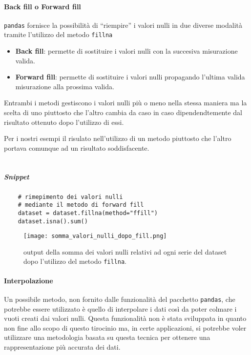 \paragraph{Back fill o Forward fill}
\texttt{pandas} fornisce la possibilità di ``riempire'' i valori nulli in due diverse
modalità tramite l'utilizzo del metodo \texttt{fillna}
\begin{itemize}
    \item \textbf{Back fill}: permette di sostituire i valori nulli con la succesiva
    misurazione valida.
    \item \textbf{Forward fill}:  permette di sostituire i valori nulli propagando
    l'ultima valida misurazione alla prossima valida.
\end{itemize}
Entrambi i metodi gestiscono i valori nulli più o meno nella stessa maniera ma la scelta
di uno piuttosto che l'altro cambia da caso in caso dipendendtemente dal risultato
ottenuto dopo l'utilizzo di essi.


Per i nostri esempi il risulato nell'utilizzo di un metodo piuttosto che l'altro
portava comunque ad un risultato soddisfacente.\\
\\
\subparagraph*{Snippet}
\begin{verbatim}
    # rimepimento dei valori nulli 
    # mediante il metodo di forward fill
    dataset = dataset.fillna(method="ffill")
    dataset.isna().sum()
\end{verbatim}
\begin{figure}[h!]
    \centering
    \texttt{[image: somma\_valori\_nulli\_dopo\_fill.png]}
    \caption{output della somma dei valori nulli relativi ad ogni serie del dataset dopo l'utilizzo del metodo \texttt{fillna}.}
\end{figure}


\paragraph{Interpolazione} 
Un possibile metodo, non fornito dalle funzionalità del pacchetto \texttt{pandas},
che potrebbe essere utilizzato è quello di interpolare i dati così da poter colmare
i vuoti creati dai valori nulli. Questa funzionalità non è stata sviluppata
in quanto non fine allo scopo di questo tirocinio ma, in certe applicazioni, si potrebbe
voler utilizzare una metodologia basata su questa tecnica per ottenere una rappresentazione
più accurata dei dati.


